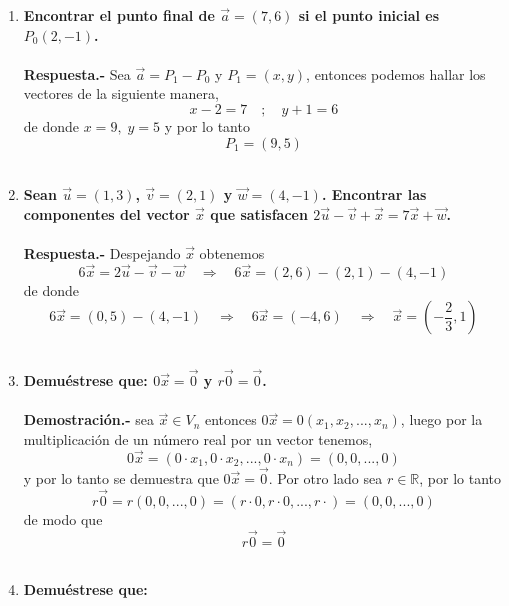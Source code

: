\begin{enumerate}

\item \textbf{\boldmath Encontrar el punto final de $\vec{a}=(7,6)$ si el punto inicial es $P_0(2,-1)$.\\\\
    Respuesta.-}\; Sea $\vec{a}=P_1-P_0$ y $P_1=(x,y)$, entonces podemos hallar los vectores de la siguiente manera,
	$$x-2=7 \quad ; \quad y+1=6$$
    de donde $x=9, \; y=5$ y por lo tanto $$P_1=(9,5)$$\\

\item \textbf{\boldmath Sean $\vec{u}=(1,3)$,  $\vec{v}=(2,1)$ y $\vec{w}=(4,-1)$. Encontrar las componentes del vector $\vec{x}$ que satisfacen $2\vec{u}-\vec{v}+\vec{x}=7\vec{x}+\vec{w}$.\\\\
    Respuesta.-}\; Despejando $\vec{x}$ obtenemos $$6\vec{x}=2\vec{u}-\vec{v}-\vec{w} \quad \Rightarrow\quad 6\vec{x}=(2,6)-(2,1)-(4,-1)$$ 
    de donde $$6\vec{x}=(0,5)-(4,-1)\quad \Rightarrow \quad 6\vec{x}=(-4,6) \quad \Rightarrow \quad \vec{x}=\left(-\dfrac{2}{3},1\right)$$\\

\item \textbf{\boldmath Demuéstrese que: $0\vec{x}=\vec{0}$ y $r\vec{0}=\vec{0}$.\\\\
    Demostración.-}\; sea $\vec{x}\in V_n$ entonces $0\vec{x}=0(x_1,x_2,...,x_n)$, luego por la multiplicación de un número real por un vector tenemos, $$0\vec{x}=(0\cdot x_1,0\cdot x_2,...,0\cdot x_n)=(0,0,...,0)$$
    y por lo tanto se demuestra que $0\vec{x}=\vec{0}.$ Por otro lado sea $r\in \mathbb{R}$, por lo tanto $$r\vec{0}=r(0,0,...,0)=(r\cdot 0,r\cdot 0,...,r\cdot)=(0,0,...,0)$$
    de modo que $$r\vec{0}=\vec{0}$$\\

\item \textbf{Demuéstrese que:}
\begin{enumerate}[\bfseries a)]


\end{enumerate}
\end{enumerate}
